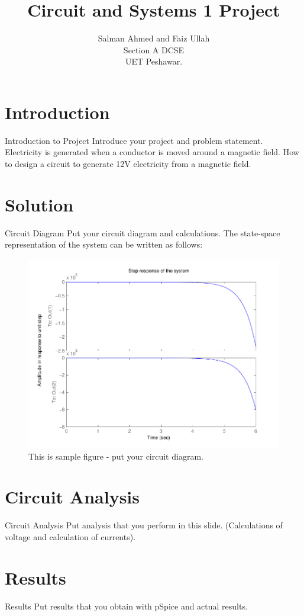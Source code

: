 \documentclass[10pt,compress,mathserif]{beamer}
\title[]{Circuit and Systems 1 Project}
\author[]{Salman Ahmed and Faiz Ullah\\ Section A DCSE \\ UET Peshawar.}
\begin{document}
\begin{frame}    \titlepage \end{frame}



\section{Introduction}
\begin{frame}{Introduction to Project}
\noindent Introduce your project and problem statement. \\ \vskip10pt
Electricity is generated when a conductor is moved around a magnetic field. How to design a circuit to generate 12V electricity from a magnetic field.

\end{frame}



\section{Solution}
\begin{frame}{Circuit Diagram}
Put your circuit diagram and calculations.
The state-space representation of the system can be written as follows:
\begin{figure}[h!]
\centering
\includegraphics[scale=0.40]{Step_Res.pdf}
\caption{This is sample figure - put your circuit diagram.}
\end{figure}

\end{frame}


\section{Circuit Analysis}
\begin{frame}{Circuit Analysis}
Put analysis that you perform in this slide. (Calculations of voltage and calculation of currents).
\end{frame}





\section{Results}
\begin{frame}{Results}
Put results that you obtain with pSpice and actual results.
\end{frame}
\end{document}

